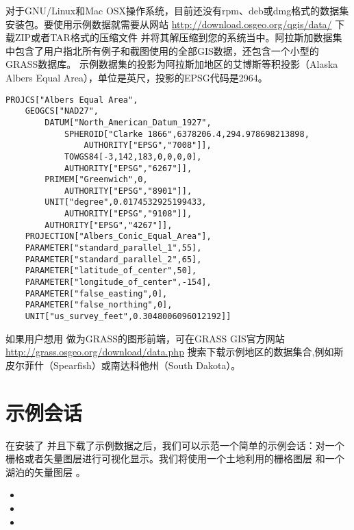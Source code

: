 \nix \osx 对于GNU/Linux和Mac OSX操作系统，目前还没有rpm、deb或dmg格式的数据集安装包。要使用示例数据就需要从网站 \url{http://download.osgeo.org/qgis/data/} 下载ZIP或者TAR格式的压缩文件  并将其解压缩到您的系统当中。阿拉斯加数据集中包含了用户指北所有例子和截图使用的全部GIS数据，还包含一个小型的GRASS数据库。 \qg 示例数据集的投影为阿拉斯加地区的艾博斯等积投影（Alaska Albers Equal Area），单位是英尺，投影的EPSG代码是2964。

\begin{verbatim}
PROJCS["Albers Equal Area",
    GEOGCS["NAD27",
        DATUM["North_American_Datum_1927",
            SPHEROID["Clarke 1866",6378206.4,294.978698213898,
                AUTHORITY["EPSG","7008"]],
            TOWGS84[-3,142,183,0,0,0,0],
            AUTHORITY["EPSG","6267"]],
        PRIMEM["Greenwich",0,
            AUTHORITY["EPSG","8901"]],
        UNIT["degree",0.0174532925199433,
            AUTHORITY["EPSG","9108"]],
        AUTHORITY["EPSG","4267"]],
    PROJECTION["Albers_Conic_Equal_Area"],
    PARAMETER["standard_parallel_1",55],
    PARAMETER["standard_parallel_2",65],
    PARAMETER["latitude_of_center",50],
    PARAMETER["longitude_of_center",-154],
    PARAMETER["false_easting",0],
    PARAMETER["false_northing",0],
    UNIT["us_survey_feet",0.3048006096012192]]
\end{verbatim}

如果用户想用 \qg 做为GRASS的图形前端，可在GRASS GIS官方网站 \url{http://grass.osgeo.org/download/data.php} 搜索下载示例地区的数据集合,例如斯皮尔菲什（Spearfish）或南达科他州（South Dakota）。

\section{示例会话}\label{samplesession}

在安装了 \qg 并且下载了示例数据之后，我们可以示范一个简单的示例会话：对一个栅格或者矢量图层进行可视化显示。我们将使用一个土地利用的栅格图层  和一个湖泊的矢量图层 。


\begin{itemize}[label=--]
\item {}
\item {}
\item {}
\end{itemize} 

